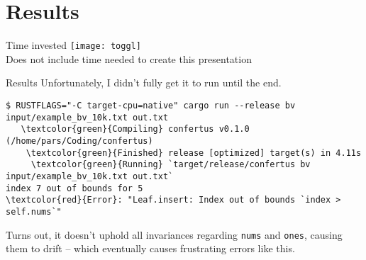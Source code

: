 \section{Results}


\begin{frame}[c]{Time invested}
    \centering
    \texttt{[image: toggl]} \\
    \color{gray} Does not include time needed to create this presentation
\end{frame}

\begin{frame}[c,fragile]{Results}
    \large
    Unfortunately, I didn't fully get it to run until the end. \\
    \normalsize
    \begin{Verbatim}[commandchars=\\\{\}]
$ RUSTFLAGS="-C target-cpu=native" cargo run --release bv input/example_bv_10k.txt out.txt
   \textcolor{green}{Compiling} confertus v0.1.0 (/home/pars/Coding/confertus)
    \textcolor{green}{Finished} release [optimized] target(s) in 4.11s
     \textcolor{green}{Running} `target/release/confertus bv input/example_bv_10k.txt out.txt`
index 7 out of bounds for 5
\textcolor{red}{Error}: "Leaf.insert: Index out of bounds `index > self.nums`"
    \end{Verbatim}
    \large
    \vspace{1em}
    Turns out, it doesn't uphold all invariances regarding \verb!nums! and
    \verb!ones!, causing them to drift -- which eventually causes frustrating
    errors like this.

\end{frame}
